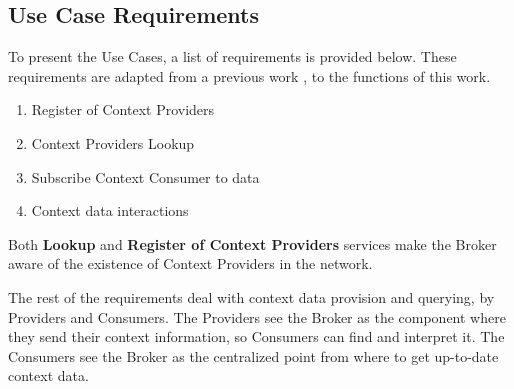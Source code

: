 \subsection{Use Case Requirements}
To present the Use Cases, a list of requirements is provided below. These requirements are adapted from a previous work \cite{crippa2010}, to the functions of this work.

\begin{enumerate}
	\item Register of Context Providers 
	\item Context Providers Lookup
	\item Subscribe Context Consumer to data
	\item Context data interactions
\end{enumerate}

Both \textbf{Lookup} and \textbf{Register of Context Providers} services make the Broker aware of the existence of Context Providers in the network.

The rest of the requirements deal with context data provision and querying, by Providers and Consumers. The Providers see the Broker as the component where they send their context information, so Consumers can find and interpret it. The Consumers see the Broker as the centralized point from where to get up-to-date context data.


